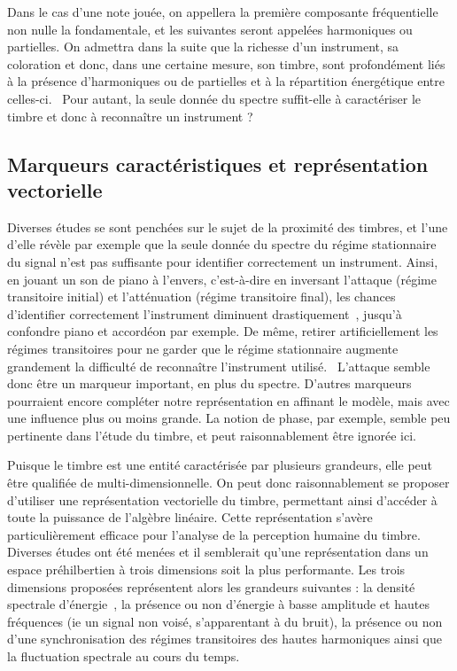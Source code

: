 \documentclass[10pt]{article}
\begin{document}
\begin{multicols}{2}
Dans le cas d'une note jouée, on appellera la première composante fréquentielle non nulle la fondamentale, et les suivantes seront appelées harmoniques ou partielles.
On admettra dans la suite que la richesse d'un instrument, sa coloration et donc, dans une certaine mesure, son timbre, sont profondément liés à la présence d'harmoniques ou de partielles et à la répartition énergétique entre celles-ci.~\cite{Perception}
Pour autant, la seule donnée du spectre suffit-elle à caractériser le timbre et donc à reconnaître un instrument ?



\label{Marqueurs}
\subsection{Marqueurs caractéristiques et représentation vectorielle}

Diverses études se sont penchées sur le sujet de la pro\-ximité des timbres, et l'une d'elle révèle par exemple que la seule donnée du spectre du régime stationnaire du si\-gnal n'est pas suffisante pour identifier correctement un ins\-trument.
Ainsi, en jouant un son de piano à l'envers, c'est-à-dire en inversant l'attaque (régime transitoire initial) et l'atténuation (régime transitoire final), les chances d'identifier correctement l'instrument diminuent drastiquement~\cite{Aspects}, jusqu'à confondre piano et accordéon par exemple.
De même, retirer artificiellement les régimes transitoires pour ne garder que le régime stationnaire augmente grandement la difficulté de reconnaître l'instrument uti\-lisé.~\cite{Perception}
L'attaque semble donc être un marqueur important, en plus du spectre. 
D'autres marqueurs pourraient encore compléter notre représentation en affinant le modèle, mais avec une influence plus ou moins grande.
La notion de phase, par exemple, semble peu pertinente dans l'étude du timbre, et peut raisonnablement être ignorée ici.~\cite{Perception}

Puisque le timbre est une entité caractérisée par plusieurs grandeurs, elle peut être qualifiée de multi-dimensionnelle.
On peut donc raisonnablement se proposer d'utiliser une représentation vectorielle du timbre, permettant ainsi d'accéder à toute la puissance de l'algèbre linéaire.
Cette représentation s'avère particulièrement efficace pour l'analyse de la perception humaine du timbre.~\cite{CCRMA}
Diverses études ont été menées et il semblerait qu'une représentation dans un espace préhilbertien à trois dimensions soit la plus performante.
Les trois dimensions proposées représentent alors les grandeurs suivantes : la densité spectrale d'énergie~\cite{EPFL}, la présence ou non d'énergie à basse amplitude et hautes fréquences (ie un signal non voisé, s'apparentant à du bruit), la présence ou non d'une synchronisation des régimes transitoires des hautes harmoniques ainsi que la fluctuation spectrale au cours du temps.~\cite{Scaling}


\end{multicols}
\end{document}

